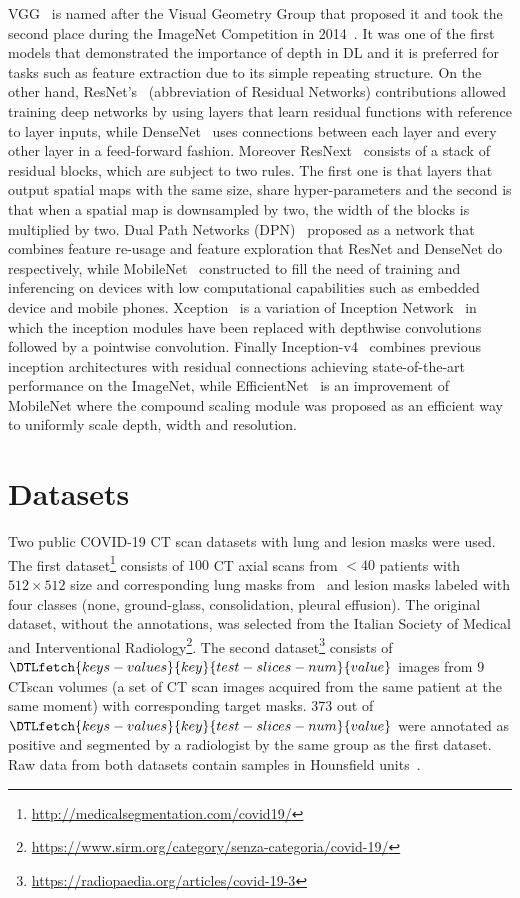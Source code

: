 \documentclass{elsarticle}
\begin{document}
VGG~\cite{simonyan2014very} is named after the Visual Geometry Group
that proposed it and took the second place during the ImageNet
Competition in 2014~\cite{deng2009imagenet}.
It was one of the first models that demonstrated the importance of
depth in DL and it is preferred for tasks such as feature extraction
due to its simple repeating structure.
On the other hand, ResNet's~\cite{he2016deep} (abbreviation of
Residual Networks) contributions allowed training deep networks by
using layers that learn residual functions with reference to layer
inputs, while DenseNet~\cite{huang2017densely} uses connections
between each layer and every other layer in a feed-forward fashion.
Moreover ResNext~\cite{xie2017aggregated} consists of a stack of
residual blocks, which are subject to two rules.
The first one is that layers that output spatial maps with the same
size, share hyper-parameters and the second is that when a spatial
map is downsampled by two, the width of the blocks is multiplied by two.
Dual Path Networks (DPN)~\cite{chen2017dual} proposed as a network
that combines feature re-usage and feature exploration that ResNet
and DenseNet do respectively, while
MobileNet~\cite{howard2017mobilenets} constructed to fill the need of
training and inferencing on devices with low computational
capabilities such as embedded device and mobile phones.
Xception~\cite{chollet2017xception} is a variation of Inception
Network~\cite{szegedy2015going} in which the inception modules have
been replaced with depthwise convolutions followed by a pointwise convolution.
Finally Inception-v4~\cite{szegedy2017inception} combines previous
inception architectures with residual connections achieving
state-of-the-art performance on the ImageNet, while
EfficientNet~\cite{tan2019efficientnet} is an improvement of
MobileNet where the compound scaling module was proposed as an
efficient way to uniformly scale depth, width and resolution.

\section{Datasets}\label{sec:datasets}
Two public COVID-19 CT scan datasets with lung and lesion masks were used.
The first
dataset\footnote{\url{http://medicalsegmentation.com/covid19/}}
consists of $100$ CT axial scans from $<40$ patients with $512\times
512$ size and corresponding lung masks
from~\cite{hofmanninger2020automatic} and lesion masks labeled with
four classes (none, ground-glass, consolidation, pleural effusion).
The original dataset, without the annotations, was selected from the
Italian Society of Medical and Interventional
Radiology\footnote{\url{https://www.sirm.org/category/senza-categoria/covid-19/}}.
The second
dataset\footnote{\url{https://radiopaedia.org/articles/covid-19-3}}
consists of $\DTLfetch{keys-values}{key}{test-slices-num}{value}$
images from $9$ CT\@ scan volumes (a set of CT scan images acquired
from the same patient at the same moment) with corresponding target
masks.
373 out of $\DTLfetch{keys-values}{key}{test-slices-num}{value}$ were
annotated as positive and segmented by a radiologist by the same
group as the first dataset.
Raw data from both datasets contain samples in Hounsfield
units~\cite{schneider1996calibration}.
\end{document}
